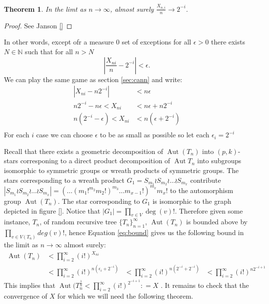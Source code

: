 \documentclass[10pt]{article} %
\newtheorem{thm}{Theorem}[section]
\theoremstyle{definition}
\DeclareMathOperator{\Aut}{Aut}
\begin{document}
\begin{thm}
 In the limt as $n \rightarrow \infty$, almost surely $\frac{X_{n,i}}{n} \rightarrow 2^{-i}$. 
\end{thm}
\begin{proof}
 See Janson \ref{}
\end{proof}

In other words, except ofr a measure 0 set of exceptions for all $ \epsilon >0 $ there exists $N \in \mathbb{N}$ such that for all $n > N$ 
\[| \frac{X_{ni}}{n} - 2^{-i}| < \epsilon. \]
We can play the same game as section \ref{sec:cann} and write:
\begin{align}\label{eq:bound}
|X_{ni} - n2^{-i}| &< n\epsilon \\
n2^{-i} -n\epsilon < X_{ni} &< n\epsilon +n2^{-i} \\
n(2^{-i} -\epsilon) < X_{ni} &< n(\epsilon +2^{-i}) \\
\end{align}
For each $i$ case we can choose $\epsilon$ to be as small as possible so let each $\epsilon_{i}  = 2^{-i}$ %

Recall that there exists a geometric decomposition of $\Aut(T_n)$ into $(p,k)$-stars corresponing to a direct product decomposition of $\Aut{T_n}$ into subgroups isomorphic to symmetric groups or wreath products of symmetric groups. The stars corresponding to a wreath product $G_1 = S_{m_{1}}\wr S_{m_{2}}\wr \dots \wr S_{m_x}$ contribute $|S_{m_{1}}\wr S_{m_{2}}\wr \dots \wr S_{m_x}| = (\dots(m_1!^{m_2}m_2!)^{m_3}\dots m_{x-1}!)^{m_x}m_x!$ to the automorphism group $\Aut(T_n)$.  The star corresponding to $G_1$ is isomorphic to the graph depicted in figure \ref{}.  Notice that $|G_{1}|  = \prod_{v \in V}\deg(v)!$.  Therefore   
given some instance, $T_n$, of random recursive tree $\{T_{n}\}_{n=1}^{\infty}$, $\Aut(T_n)$ is bounded above by $\prod_{v \in V(T_n)}deg(v)!$, hence Equation \ref{eq:bound} gives us the following bound in the limit as $n \rightarrow \infty$ almost surely:
\begin{align}
\Aut(T_n)&< \prod_{i=2}^{\infty}(i!)^{X_{ni}}\\
&< \prod_{i=2}^{\infty}(i!)^{n(\epsilon_{i} + 2^{-i})}
&< \prod_{i=2}^{\infty}(i!)^{n(2^{-i} + 2^{-i})}
&< \prod_{i=2}^{\infty}(i!)^{n2^{-i+1}}
\end{align}
This implies that $\Aut(T_{n}^{\frac{1}{n}} < \prod_{i=2}^{\infty}(i!)^{2^{-i+1}} : = X$ .  It remains to check that the convergence of $X$ for which we will need the following theorem.
\end{document}
